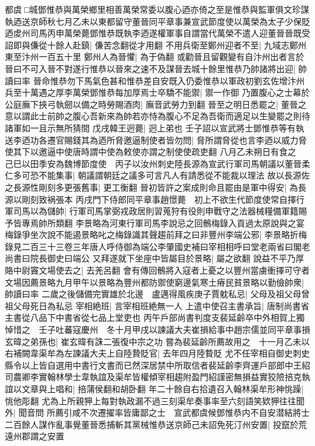 都虞□城鄧惟恭與萬榮鄉里相善萬榮常委以腹心迺亦倚之至是惟恭與監軍俱文珍謀執迺送京師秋七月乙未以東都留守董晉同平章事兼宣武節度使以萬榮為太子少保貶迺䖍州司馬丙申萬榮薨鄧惟恭既執李迺遂權軍事自謂當代萬榮不遣人迎董晉晉既受詔即與傔從十餘人赴鎮|{
	傔苦念翻從才用翻}
不用兵衛至鄭州迎者不至|{
	九域志鄭州東至汴州一百五十里}
鄭州人為晉懼|{
	為于偽翻}
或勸晉且留觀變有自汴州出者言於晉曰不可入晉不對遂行惟恭以晉來之速不及謀晉去城十餘里惟恭乃帥諸將出迎|{
	帥讀曰率}
晉命惟恭勿下馬氣色甚和惟恭差自安既入仍委惟恭以軍政初劉玄佐增汴州兵至十萬遇之厚李萬榮鄧惟恭每加厚焉士卒驕不能禦|{
	禦一作御}
乃置腹心之士幕於公庭廡下挾弓執劒以備之時勞賜酒肉|{
	廡音武勞力到翻}
晉至之明日悉罷之|{
	董晉之意以謂此士前帥之腹心吾新來為帥若亦恃為腹心不足為吾衛而適足以生變罷之則待諸軍如一且示無所猜間}
戊戌韓王迥薨|{
	迥上弟也}
壬子詔以宣武將士鄧惟恭等有執送李迺功各遷官賜錢其為迺所脅邀逼制使者皆勿問|{
	脅所謂脅從也言李迺以威力脅使其下以邀逼中使唐時謂中使為敕使亦謂之制使使疏吏翻}
八月乙未朔日有食之　己巳以田季安為魏博節度使　丙子以汝州刺史陸長源為宣武行軍司馬朝議以董晉柔仁多可恐不能集事|{
	朝議謂朝廷之議多可言凡人有請悉從不能裁以理法}
故以長源佐之長源性剛刻多更張舊事|{
	更工衡翻}
晉初皆許之案成則命且罷由是軍中得安|{
	為長源以剛刻致祸張本}
丙戌門下侍郎同平章事趙憬薨　初上不欲生代節度使常自擇行軍司馬以為儲帥|{
	行軍司馬掌弼戎政居則習蒐狩有役則申戰守之法器械糧備軍籍賜予皆專焉帥所類翻}
李景略為河東行軍司馬李說忌之回鶻梅錄入貢過太原說與之宴梅錄爭坐次說不能遏景略叱之梅錄識其聲趨前拜之曰非豐州李端公邪|{
	李景略折梅錄見二百三十三卷三年唐人呼侍御為端公李肇國史補曰宰相相呼曰堂老兩省曰閣老尚書曰院長御史曰端公}
又拜遂就下坐座中皆屬目於景略|{
	屬之欲翻}
說益不平乃厚賂中尉竇文場使去之|{
	去羌呂翻}
會有傳回鶻將入寇者上憂之以豐州當虜衝擇可守者文場因薦景略九月甲午以景略為豐州都防禦使窮邊氣寒土瘠民貧景略以勤儉帥衆|{
	帥讀曰率}
二歲之後儲備完實雄於北邊　盧邁得風疾庚子賈躭私忌|{
	父母及祖父母曾祖父母死日為私忌}
宰相絶班|{
	言宰相班絶無一人}
上遣中使召主書承旨|{
	唐制尚書省主書從八品下中書省從七品上堂吏也}
丙午戶部尚書判度支裴延齡卒中外相賀上獨悼惜之　壬子吐蕃寇慶州　冬十月甲戌以諫議大夫崔損給事中趙宗儒並同平章事損玄暐之弟孫也|{
	崔玄暐有誅二張復中宗之功}
嘗為裴延齡所薦故用之　十一月乙未以右補闕韋渠牟為左諫議大夫上自陸贄貶官|{
	去年四月陸䞇貶}
尤不任宰相自御史刺史縣令以上皆自選用中書行文書而已然深居禁中所取信者裴延齡李齊運戶部郎中王紹司農卿李實翰林學士韋執誼及渠牟皆權傾宰相趨附盈門紹謹密無損益實狡險掊克執誼以文章與上唱和|{
	掊蒲侯翻和胡卧翻}
年二十餘自右拾遺召入翰林渠牟形神恌躁|{
	恌他彫翻}
尤為上所親狎上每對執政漏不過三刻渠牟奏事率至六刻語笑欵狎往往聞外|{
	聞音問}
所薦引咸不次遷擢率皆庸鄙之士　宣武都虞候鄧惟恭内不自安潜結將士二百餘人謀作亂事覺董晉悉捕斬其黨械惟恭送京師己未詔免死汀州安置|{
	投竄於荒遠州郡謂之安置}


